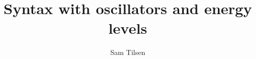 \author{Sam Tilsen}
\title{Syntax with oscillators and energy levels}

\renewcommand{\lsSeries}{silp} %
\renewcommand{\lsSeriesNumber}{99} %





